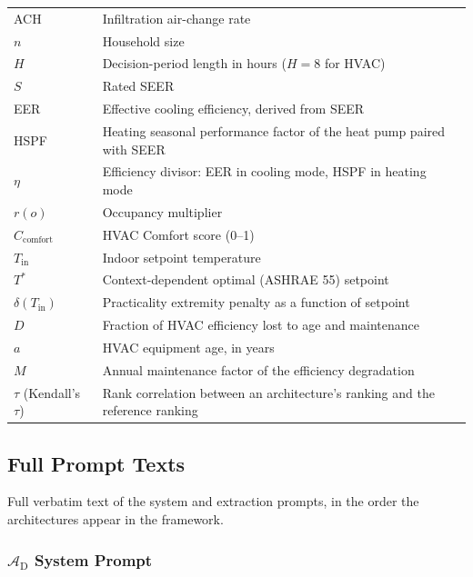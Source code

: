 \documentclass[11pt]{article}
\begin{document}
\begin{table}[htbp]
\begin{tabular}{@{}ll@{}}
ACH & Infiltration air-change rate \\
$n$ & Household size \\
$H$ & Decision-period length in hours ($H=8$ for HVAC) \\
$S$ & Rated SEER \\
EER & Effective cooling efficiency, derived from SEER \\
HSPF & Heating seasonal performance factor of the heat pump paired with SEER \\
$\eta$ & Efficiency divisor: EER in cooling mode, HSPF in heating mode \\
$r(o)$ & Occupancy multiplier \\
$C_{\mathrm{comfort}}$ & HVAC Comfort score (0--1) \\
$T_{\mathrm{in}}$ & Indoor setpoint temperature \\
$T^{*}$ & Context-dependent optimal (ASHRAE 55) setpoint \\
$\delta(T_{\mathrm{in}})$ & Practicality extremity penalty as a function of setpoint \\
$D$ & Fraction of HVAC efficiency lost to age and maintenance \\
$a$ & HVAC equipment age, in years \\
$M$ & Annual maintenance factor of the efficiency degradation \\
$\tau$ (Kendall's $\tau$) & Rank correlation between an architecture's ranking and the reference ranking \\
\bottomrule
\end{tabular}
\end{table}

\subsection{Full Prompt Texts}
\label{app:prompts}

Full verbatim text of the system and extraction prompts, in the order the architectures appear in the framework.

\subsubsection{\texorpdfstring{$\mathcal{A}_{\text{D}}$}{A\_D} System Prompt}
\end{document}
